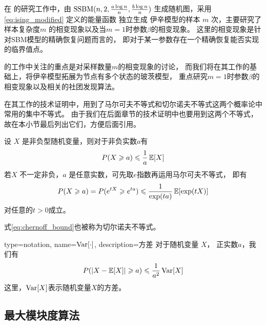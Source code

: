 在\citet{ye2020exact} 的研究工作中，由 $\operatorname{SSBM}(n,2,\frac{a \log n}{n}, \frac{b \log n}{n})$
生成随机图，采用 \eqref{eq:ising_modified} 定义的能量函数
独立生成 伊辛模型的样本 $m$ 次，主要研究了样本复杂度$m$
的相变现象以及当$m=1$时参数$\beta$的相变现象。
这里的相变现象是针对SBM模型的精确恢复问题而言的，
即对于某一参数存在一个精确恢复能否实现的临界值点。

\citet{ye2020exact} 的工作中关注的重点是对采样数量$m$的相变现象的讨论，
而我们将在其工作的基础上，将伊辛模型拓展为节点有多个状态的玻茨模型，
重点研究$m=1$时参数$\beta$的相变现象以及相关的社团发现算法。

\citet{ye2020exact} 在其工作的技术证明中，用到了马尔可夫不等式和切尔诺夫不等式这两个概率论中常用的集中不等式。
由于我们在后面章节的技术证明中也要用到这两个不等式，故在本小节最后列出它们，方便后面引用。

\begin{lemma}[马尔可夫不等式] 
  设 $X$ 是非负型随机变量，则对于非负实数$a$有
  \begin{equation}
    P(X\geqslant a) \leqslant {1 \over a} \operatorname{\mathbb{E}}[X]   
  \end{equation}
   若$X$ 不一定非负，$a$ 是任意实数，可先取$e$指数再运用马尔可夫不等式，
   即有
   \begin{equation}\label{eq:chernoff_bound}
    P(X\geqslant a) = P(e^{tX} \geqslant e^{ta}) \leqslant { 1 \over \exp(ta)} \operatorname{\mathbb{E}}[\exp(tX)]
   \end{equation}
   对任意的$t>0$成立。

   式\eqref{eq:chernoff_bound}也被称为切尔诺夫不等式。
\end{lemma}
\begin{lemma}[切比雪夫不等式]
{
  type=notation,
  name={$\operatorname{\mathrm{Var}}[\cdot]$},
  description={方差}
}
  对于随机变量 $X$， 正实数$a$，我们有
  \begin{equation}
    P(\lvert X-\operatorname{\mathbb{E}}[X]\rvert \geqslant a) \leqslant {1 \over a^2} \operatorname{\mathrm{Var}}[X]
  \end{equation}
  这里，$\operatorname{\mathrm{Var}}[X]$表示随机变量$X$的方差。
\end{lemma}



\subsection{最大模块度算法}

